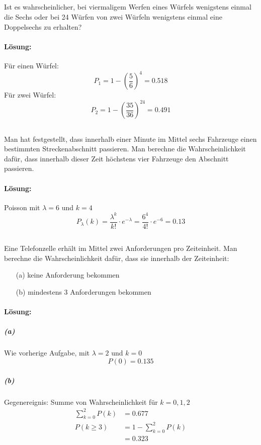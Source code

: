 \documentclass[ngerman]{scrartcl}
\begin{document}
\subsection{}
Ist es wahrscheinlicher, bei viermaligem Werfen eines Würfels wenigstens einmal die Sechs oder bei 24 Würfen von zwei Würfeln wenigstens einmal eine Doppelsechs zu erhalten?
\paragraph{Lösung:}
Für einen Würfel:
\begin{equation*}
P_1 = 1- \left(\frac{5}{6}\right)^{4} = 0.518
\end{equation*}
Für zwei Würfel:
\begin{equation*}
P_2 = 1- \left(\frac{35}{36}\right)^{24} = 0.491
\end{equation*}

\subsection{}
Man hat festgestellt, dass innerhalb einer Minute im Mittel sechs Fahrzeuge einen bestimmten Streckenabschnitt passieren. Man berechne die Wahrscheinlichkeit dafür, dass innerhalb dieser Zeit höchstens vier Fahrzeuge den Abschnitt passieren.
\paragraph{Lösung:}
Poisson mit $\lambda = 6$ und $k= 4$
\begin{equation*}
P_\lambda(k) = \frac{\lambda^{k}}{k!}\cdot e^{-\lambda} = \frac{6^{4}}{4!}\cdot e^{-6} = 0.13
\end{equation*}

\subsection{}
Eine Telefonzelle erhält im Mittel zwei Anforderungen pro Zeiteinheit. Man berechne die Wahrscheinlichkeit dafür, dass sie innerhalb der Zeiteinheit:
\begin{enumerate}
\item[(a)] keine Anforderung bekommen
\item[(b)] mindestens 3 Anforderungen bekommen
\end{enumerate}
\paragraph{Lösung:}
\subparagraph{(a)}
Wie vorherige Aufgabe, mit $\lambda=2$ und $k=0$\[ P(0) = 0.135\]
\subparagraph{(b)}
Gegenereignis: Summe von Wahrscheinlichkeit für $k=0,1,2$
\begin{align*}
\sum_{k=0}^2{P(k)} &= 0.677 \\
P(k\geq 3) &= 1 - \sum_{k=0}^2{P(k)} \\
&= 0.323
\end{align*}
\end{document}
